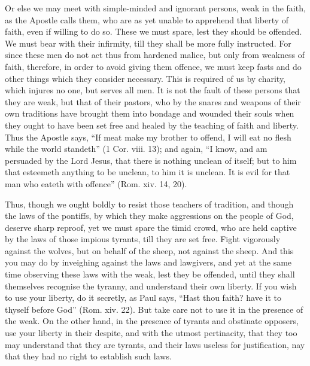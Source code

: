 Or else we may meet with simple-minded and ignorant persons, weak in the
faith, as the Apostle calls them, who are as yet unable to apprehend that
liberty of faith, even if willing to do so. These we must spare, lest they
should be offended. We must bear with their infirmity, till they shall be
more fully instructed. For since these men do not act thus from hardened
malice, but only from weakness of faith, therefore, in order to avoid
giving them offence, we must keep fasts and do other things which they
consider necessary. This is required of us by charity, which injures no
one, but serves all men. It is not the fault of these persons that they
are weak, but that of their pastors, who by the snares and weapons of
their own traditions have brought them into bondage and wounded their
souls when they ought to have been set free and healed by the teaching of
faith and liberty. Thus the Apostle says, ``If meat make my brother to
offend, I will eat no flesh while the world standeth'' (1 Cor. viii. 13);
and again, ``I know, and am persuaded by the Lord Jesus, that there is
nothing unclean of itself; but to him that esteemeth anything to be
unclean, to him it is unclean. It is evil for that man who eateth with
offence'' (Rom. xiv. 14, 20).

Thus, though we ought boldly to resist those teachers of tradition, and
though the laws of the pontiffs, by which they make aggressions on the
people of God, deserve sharp reproof, yet we must spare the timid crowd,
who are held captive by the laws of those impious tyrants, till they are
set free. Fight vigorously against the wolves, but on behalf of the sheep,
not against the sheep. And this you may do by inveighing against the laws
and lawgivers, and yet at the same time observing these laws with the
weak, lest they be offended, until they shall themselves recognise the
tyranny, and understand their own liberty. If you wish to use your
liberty, do it secretly, as Paul says, ``Hast thou faith? have it to
thyself before God'' (Rom. xiv. 22). But take care not to use it in the
presence of the weak. On the other hand, in the presence of tyrants and
obstinate opposers, use your liberty in their despite, and with the utmost
pertinacity, that they too may understand that they are tyrants, and their
laws useless for justification, nay that they had no right to establish
such laws.

